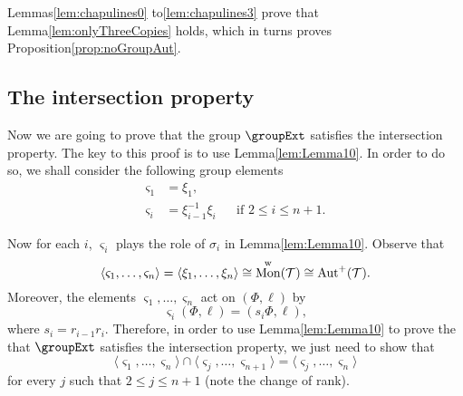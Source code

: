\documentclass[final]{amsart}
\theoremstyle{plain}
\theoremstyle{definition}
\theoremstyle{remark}
\numberwithin{equation}{section}
\renewcommand{\leq}{\leqslant} \renewcommand{\geq}{\geqslant}
\renewcommand{\{}{\lbrace}
\renewcommand{\}}{\rbrace}
\newcommand{\cT}{\mathcal{T}}
\DeclareMathOperator{\mon}{Mon}
\DeclareMathOperator{\monw}{\mon^{w}}
\newcommand{\te}{\xi}
\newcommand{\es}{\varsigma}
\begin{document}
Lemmas\nobreakspace  \ref {lem:chapulines0} to\nobreakspace  \ref {lem:chapulines3}  prove that Lemma\nobreakspace \ref {lem:onlyThreeCopies} holds, which in turns proves Proposition\nobreakspace \ref {prop:noGroupAut}.



























 \subsection{The intersection property} \label{sec:IP}
Now we are going to prove that the group $\groupExt$  satisfies the intersection property. 
The key to this proof is to use Lemma\nobreakspace \ref {lem:Lemma10}. 
In order to do so, we shall consider the following group elements
\begin{equation}\label{eq:gensEs}
\begin{aligned}
  \es_{1} &= \te_{1}, &&\\
  \es_{i} &= \te_{i-1}^{-1} \te_{i} && \text{if } 2 \leq i \leq n+1.
\end{aligned}
\end{equation}

Now for each $i$, $\es_{i}$ plays the role of $\sigma_{i}$ in Lemma\nobreakspace \ref {lem:Lemma10}.
Observe that
\begin{equation}
\langle \es_{1}, \dots, \es_{n} \rangle = \langle \te_{1}, \dots, \te_{n} \rangle \cong \monw(\cT) \cong \autp(\cT).
\end{equation}
Moreover, the elements $\es_{1}, \dots, \es_{n}$ act on $(\Phi, \ell)$ by \[\es_{i}(\Phi,\ell) = (s_{i} \Phi, \ell),\] where $s_{i} = r_{i-1}r_{i}$. 
Therefore, in order to use Lemma\nobreakspace \ref {lem:Lemma10} to prove the that $\groupExt$ satisfies the intersection property, we just need to show that
\begin{equation}
  \langle \es_{1}, \dots, \es_{n} \rangle \cap \langle \es_{j}, \dots, \es_{n+1} \rangle = \langle \es_{j}, \dots, \es_{n}\rangle
\end{equation}
for every $j$ such that $2 \leq j \leq n+1$ (note the change of rank).
\end{document}
